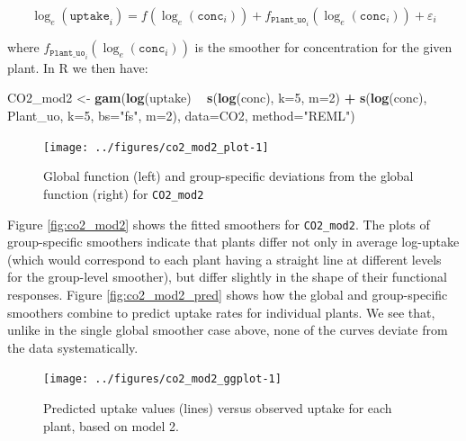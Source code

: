\documentclass[12pt]{article}
\newenvironment{Shaded}{\begin{snugshade}}{\end{snugshade}}
\newcommand{\KeywordTok}[1]{\textcolor[rgb]{0.13,0.29,0.53}{\textbf{#1}}}
\newcommand{\DataTypeTok}[1]{\textcolor[rgb]{0.13,0.29,0.53}{#1}}
\newcommand{\DecValTok}[1]{\textcolor[rgb]{0.00,0.00,0.81}{#1}}
\newcommand{\StringTok}[1]{\textcolor[rgb]{0.31,0.60,0.02}{#1}}
\newcommand{\OperatorTok}[1]{\textcolor[rgb]{0.81,0.36,0.00}{\textbf{#1}}}
\newcommand{\NormalTok}[1]{#1}
\begin{document}
\[
\log_e(\texttt{uptake}_i) = f(\log_e(\texttt{conc}_i)) + f_{\texttt{Plant\_uo}_i}(\log_e(\texttt{conc}_i)) + \varepsilon_i
\]

where \(f_{\texttt{Plant\_uo}_i}(\log_e(\texttt{conc}_i))\) is the
smoother for concentration for the given plant. In R we then have:

\begin{Shaded}
\begin{Highlighting}[]
\NormalTok{CO2_mod2 <-}\StringTok{ }\KeywordTok{gam}\NormalTok{(}\KeywordTok{log}\NormalTok{(uptake) }\OperatorTok{~}\StringTok{ }\KeywordTok{s}\NormalTok{(}\KeywordTok{log}\NormalTok{(conc), }\DataTypeTok{k=}\DecValTok{5}\NormalTok{, }\DataTypeTok{m=}\DecValTok{2}\NormalTok{) }\OperatorTok{+}\StringTok{ }
\StringTok{                  }\KeywordTok{s}\NormalTok{(}\KeywordTok{log}\NormalTok{(conc), Plant_uo, }\DataTypeTok{k=}\DecValTok{5}\NormalTok{,  }\DataTypeTok{bs=}\StringTok{"fs"}\NormalTok{, }\DataTypeTok{m=}\DecValTok{2}\NormalTok{),}
                \DataTypeTok{data=}\NormalTok{CO2, }\DataTypeTok{method=}\StringTok{"REML"}\NormalTok{)}
\end{Highlighting}
\end{Shaded}

\begin{figure}
\texttt{[image: ../figures/co2\_mod2\_plot-1]} \caption{\label{fig:co2_mod2}Global function (left) and group-specific deviations from the global function (right) for \texttt{CO2\_mod2}}\label{fig:co2_mod2_plot}
\end{figure}

Figure \ref{fig:co2_mod2} shows the fitted smoothers for
\texttt{CO2\_mod2}. The plots of group-specific smoothers indicate that
plants differ not only in average log-uptake (which would correspond to
each plant having a straight line at different levels for the
group-level smoother), but differ slightly in the shape of their
functional responses. Figure \ref{fig:co2_mod2_pred} shows how the
global and group-specific smoothers combine to predict uptake rates for
individual plants. We see that, unlike in the single global smoother
case above, none of the curves deviate from the data systematically.

\begin{figure}
\texttt{[image: ../figures/co2\_mod2\_ggplot-1]} \caption{\label{fig:co2_mod2_pred}Predicted uptake values (lines) versus observed uptake for each plant, based on model 2.}\label{fig:co2_mod2_ggplot}
\end{figure}
\end{document}
